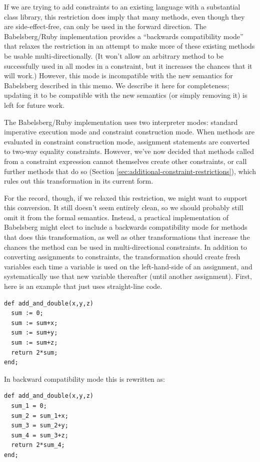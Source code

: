 \documentclass{article}
\begin{document}
If we are trying to add constraints to an existing language with a
substantial class library, this restriction does imply that many
methods, even though they are side-effect-free, can only be used in
the forward direction.  The Babelsberg/Ruby implementation provides a
``backwards compatibility mode'' that relaxes the restriction in an
attempt to make more of these existing methods be usable
multi-directionally.  (It won't allow an arbitrary method to be
successfully used in all modes in a constraint, but it increases the
chances that it will work.)  However, this mode is incompatible with
the new semantics for Babelsberg described in this memo.  We describe
it here for completeness; updating it to be compatible with the new
semantics (or simply removing it) is left for future work.

The Babelsberg/Ruby implementation uses two interpreter modes:
standard imperative execution mode and constraint construction mode.
When methods are evaluated in constraint construction mode, assignment
statements are converted to two-way equality constraints.  However,
we've now decided that methods called from a constraint expression
cannot themselves create other constraints, or call further methods
that do so (Section \ref{sec:additional-constraint-restrictions}),
which rules out this transformation in its current form.

For the record, though, if we relaxed this restriction, we might want
to support this conversion.  It still doesn't seem entirely clean, so
we should probably still omit it from the formal semantics.  Instead,
a practical implementation of Babelsberg might elect to include a
backwards compatibility mode for methods that does this
transformation, as well as other transformations that increase the
chances the method can be used in multi-directional constraints.  In
addition to converting assignments to constraints, the transformation
should create fresh variables each time a variable is used on the
left-hand-side of an assignment, and systematically use that new
variable thereafter (until another assignment).  First, here is an
example that just uses straight-line code.

\begin{verbatim}
def add_and_double(x,y,z)
  sum := 0;
  sum := sum+x;
  sum := sum+y;
  sum := sum+z;
  return 2*sum;
end;
\end{verbatim}

In backward compatibility mode this is rewritten as:
\begin{verbatim}
def add_and_double(x,y,z)
  sum_1 = 0;
  sum_2 = sum_1+x;
  sum_3 = sum_2+y;
  sum_4 = sum_3+z;
  return 2*sum_4;
end;
\end{verbatim}
\end{document}
